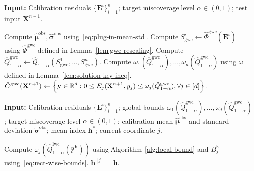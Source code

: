 \begin{algorithm}[!htb]
\caption{Global-Worst-Case TSCP (TSCP-GWC)}
\label{alg:global}
\textbf{Input:} Calibration residuals $\{\mathbf{E}^i\}_{i=1}^{n}$; target miscoverage level $\alpha\in(0,1)$; test input $\mathbf{X}^{n+1}$.
\begin{algorithmic}[1]
\State Compute $\hat{\boldsymbol\mu}^{\mathrm{obs}}, \hat{\boldsymbol\sigma}^{\mathrm{obs}}$ using~\eqref{eq:plug-in-mean-std}.
\State Compute $S^i_{\mathrm{gwc}}\gets \hat{\Phi}^{\mathrm{gwc}}(\mathbf{E}^i)$ using $\hat{\Phi}^{\mathrm{gwc}}$ defined in Lemma~\ref{lem:gwc-rescaling}.
\State Compute $\hat{Q}^{\mathrm{gwc}}_{1-\alpha} \gets \hat{Q}_{1-\alpha}(S^1_{\mathrm{gwc}},\dots, S^n_{\mathrm{gwc}})$.
\State Compute $\omega_1(\hat{Q}^{\mathrm{gwc}}_{1-\alpha}),\ldots,\omega_d(\hat{Q}^{\mathrm{gwc}}_{1-\alpha})$ using $\omega$ defined in Lemma~\ref{lem:solution-key-ineq}.
\State \Return $\displaystyle \hat{C}^{\mathrm{gwc}}(\mathbf{X}^{n+1}) \gets \left\{\mathbf y\in \mathbb{R}^d: 0\leq E_j(\mathbf{X}^{n+1}, y_j) \leq  \omega_j(\hat{Q}^{\mathrm{gwc}}_{1-\alpha}), \forall j \in [d]\right\}$.
\end{algorithmic} 
\end{algorithm}

\begin{algorithm}[!htbp]
\caption{Backward Search in Algorithm~\ref{alg:shortcut}}
\label{alg:backward}
\textbf{Input:} Calibration residuals $\{\mathbf{E}^i\}_{i=1}^{n}$; global bounds $\omega_1(\hat{Q}^{\mathrm{gwc}}_{1-\alpha}),\ldots,\omega_d(\hat{Q}^{\mathrm{gwc}}_{1-\alpha})$; target miscoverage level $\alpha\in(0,1)$; calibration mean $\hat{\boldsymbol\mu}^{\mathrm{obs}}$ and standard deviation $\hat{\boldsymbol\sigma}^{\mathrm{obs}}$; mean index $\mathbf{h}^*$; current coordinate $j$.
\begin{algorithmic}[1]
        \State Compute $\omega_j(\hat{Q}^{\mathrm{lwc}}_{1-\alpha}(\mathcal{Y}^{\mathbf{h}}))$ using Algorithm~\ref{alg:local-bound} and $B^{\mathbf{h}}_j$ using~\eqref{eq:rect-wise-bounds}.
            \State \Return $\mathbf{h}^{[j]} = \mathbf{h}$.
        \EndIf
    \EndFor
\end{algorithmic}
\end{algorithm}

